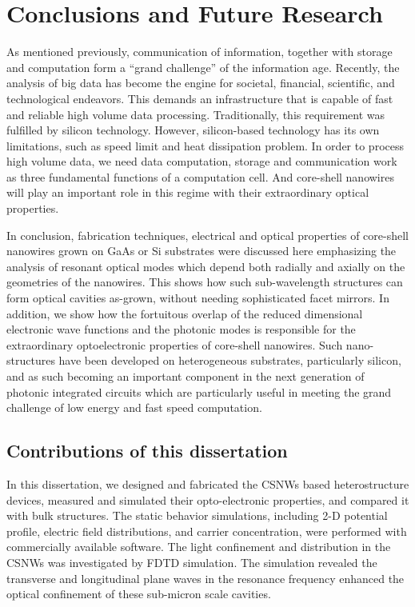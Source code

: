 \chapter{Conclusions and Future Research} \label{conclusions}

As mentioned previously, communication of information, together with storage
and computation form a “grand challenge” of the information age.  Recently, the
analysis of big data has become the engine for societal, financial, scientific,
and technological endeavors. This demands an infrastructure that is capable of
fast and reliable high volume data processing. Traditionally, this requirement
was fulfilled by silicon technology. However, silicon-based technology has its
own limitations, such as speed limit and heat dissipation problem. In order to
process high volume data, we need data computation, storage and communication
work as three fundamental functions of a computation cell. And core-shell
nanowires will play an important role in this regime with their extraordinary
optical properties.

In conclusion, fabrication techniques, electrical and optical properties of
core-shell nanowires grown on GaAs or Si substrates were discussed here
emphasizing the analysis of resonant optical modes which depend both radially
and axially on the geometries of the nanowires. This shows how such
sub-wavelength structures can form optical cavities as-grown, without needing
sophisticated facet mirrors. In addition, we show how the fortuitous overlap of
the reduced dimensional electronic wave functions and the photonic modes is
responsible for the extraordinary optoelectronic properties of core-shell
nanowires. Such nano-structures have been developed on heterogeneous
substrates, particularly silicon, and as such becoming an important component
in the next generation of photonic integrated circuits which are particularly
useful in meeting the grand challenge of low energy and fast speed computation.

\section{Contributions of this dissertation}

In this dissertation, we designed and fabricated the CSNWs based
heterostructure devices, measured and simulated their opto-electronic
properties, and compared it with bulk structures. The static behavior
simulations, including 2-D potential profile, electric field distributions, and
carrier concentration, were performed with commercially available software. The
light confinement and  distribution in the CSNWs was investigated by FDTD
simulation. The simulation revealed the transverse and longitudinal plane waves
in the resonance frequency enhanced the optical confinement of these sub-micron
scale cavities.

